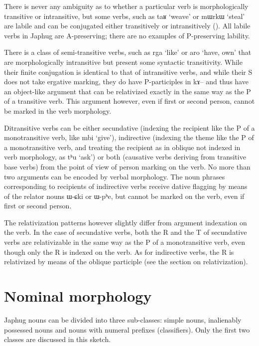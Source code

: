 \documentclass[oldfontcommands,oneside,a4paper,11pt]{article}
\newcommand{\ipa}[1]{{\phon#1}} %
\begin{document}
There is never any ambiguity as to whether a particular verb is morphologically  transitive or intransitive, but some verbs, such as \ipa{taʁ} `weave' or \ipa{mɯrkɯ} `steal' are labile and can be conjugated either transitively or intransitively (\citealt{jacques12demotion}). All labile verbs in Japhug are A-preserving; there are no examples of P-preserving lability.

There is a class of semi-transitive verbs, such as \ipa{rga} `like' or \ipa{aro} `have, own' that are morphologically intransitive but present some syntactic transitivity. While their finite conjugation is identical to that of intransitive verbs, and while their S does not take ergative marking, they do have P-participles in \ipa{kɤ--} and thus have an object-like argument that can be relativized exactly in the same way as the P of a transitive verb. This argument however, even if first or second person, cannot be marked in the verb morphology.

Ditransitive verbs can be either secundative (indexing the recipient like the P of a monotransitive verb, like \ipa{mbi} `give'), indirective (indexing the theme like the P of a monotransitive verb, and treating the recipient as in oblique not indexed in verb morphology, as \ipa{tʰu} `ask') or both (causative verbs deriving from transitive base verbs) from the point of view of person marking on the verb. No more than two arguments can be encoded by verbal morphology. The noun phrases corresponding to recipients of indirective verbs receive dative flagging by means of the relator nouns \ipa{ɯ-ɕki} or \ipa{ɯ-pʰe}, but cannot be marked on the verb, even if first or second person.

The relativization patterns however slightly differ from argument indexation on the verb.
In the case of secundative verbs, both the R and the T of secundative verbs are relativizable in the same way as the P of a monotransitive verb, even though only the R is indexed on the verb. As for indirective verbs, the R is relativized by means of the oblique participle (see the section on relativization).

 

\section{Nominal morphology}
Japhug nouns can be divided into three sub-classes: simple nouns, inalienably possessed nouns and nouns with numeral prefixes (classifiers). Only the first two classes are discussed in this sketch. 
\end{document}

